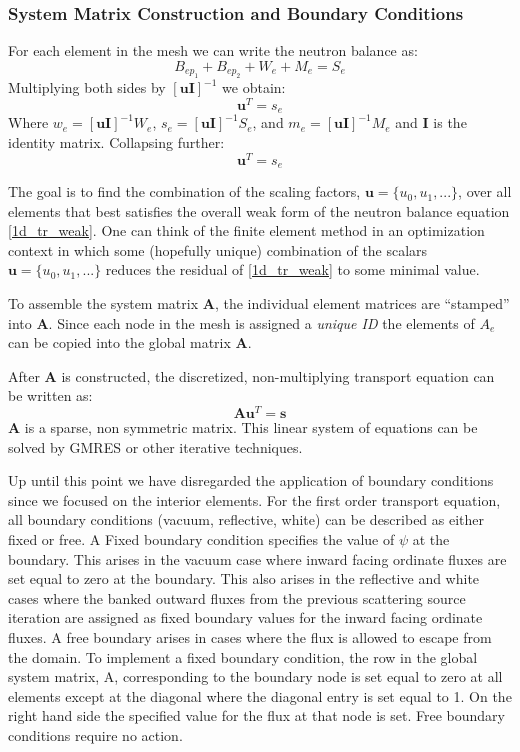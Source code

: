 \subsubsection{System Matrix Construction and Boundary Conditions}

For each element in the mesh we can write the neutron balance as:
\begin{equation}
B_{ep_1} + B_{ep_2} + W_e + M_e = S_e
\end{equation}
Multiplying both sides by $[\mathbf u \mathbf I]^{-1}$ we obtain:
\begin{equation}
[b_{ep_1} + b_{ep_2} + w_e + m_e] \mathbf u^T = s_e
\end{equation}
Where $w_e= [\mathbf u \mathbf I]^{-1}W_e $, $s_e=[\mathbf u \mathbf I]^{-1} S_e $, and $m_e=[\mathbf u \mathbf I ]^{-1}M_e $ and $\mathbf I$ is the identity matrix.  Collapsing further:
\begin{equation}
[A_e] \mathbf u^T = s_e
\end{equation}

The goal is to find the combination of the scaling factors, $\mathbf u=\{u_0, u_1, ...\}$, over all elements that best satisfies the overall weak form of the neutron balance equation \ref{1d_tr_weak}.  One can think of the finite element method in an optimization context in which some (hopefully unique) combination of the scalars $\mathbf u =\{u_0, u_1, ...\}$ reduces the residual of \ref{1d_tr_weak} to some minimal value.
 
 To assemble the system matrix $\mathbf A$, the individual element matrices are ``stamped'' into $\mathbf A$. Since
each node in the mesh is assigned a \emph{unique ID} the elements of $A_e$ can be copied into the global matrix $\mathbf A$.

After $\mathbf A$ is constructed, the discretized, non-multiplying transport equation can be written as:
\begin{equation}
\mathbf A \mathbf u^T = \mathbf s
\end{equation}
$\mathbf A$ is a sparse, non symmetric matrix. This linear system of equations can be solved by GMRES or other iterative techniques.
 
Up until this point we have disregarded the application of boundary conditions since we focused on the interior elements.  For the first order transport equation, all boundary conditions (vacuum, reflective, white) can be
described as either fixed or free. A Fixed boundary condition specifies the value of $\psi$ at the boundary.
This arises in the vacuum case where inward facing ordinate fluxes are set equal to zero at the
boundary. This also arises in the reflective and white cases where the banked outward fluxes from the
previous scattering source iteration are assigned as fixed boundary values for the inward facing ordinate
fluxes. A free boundary arises in cases where the flux is allowed to escape from the domain.
To implement a fixed boundary condition, the row in the global system matrix, A, corresponding
to the boundary node is set equal to zero at all elements except at the diagonal where the diagonal
entry is set equal to 1. On the right hand side the specified value for the flux at that node is set.
Free boundary conditions require no action.